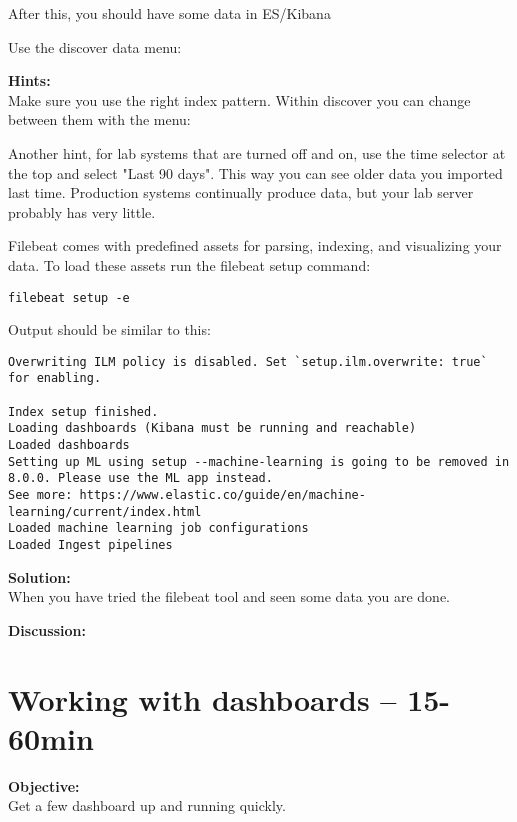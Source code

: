 \documentclass[a4paper,11pt,notitlepage]{report}
\begin{document}
After this, you should have some data in ES/Kibana

Use the discover data menu:


{\bf Hints:}\\
Make sure you use the right index pattern. Within discover you can change between them with the menu:


Another hint, for lab systems that are turned off and on, use the time selector at the top and select "Last 90 days". This way you can see older data you imported last time. Production systems continually produce data, but your lab server probably has very little.


Filebeat comes with predefined assets for parsing, indexing, and visualizing your data. To load these assets run the filebeat setup command:

\begin{verbatim}
filebeat setup -e
\end{verbatim}

Output should be similar to this:
\begin{verbatim}
Overwriting ILM policy is disabled. Set `setup.ilm.overwrite: true` for enabling.

Index setup finished.
Loading dashboards (Kibana must be running and reachable)
Loaded dashboards
Setting up ML using setup --machine-learning is going to be removed in 8.0.0. Please use the ML app instead.
See more: https://www.elastic.co/guide/en/machine-learning/current/index.html
Loaded machine learning job configurations
Loaded Ingest pipelines
\end{verbatim}


{\bf Solution:}\\
When you have tried the filebeat tool and seen some data you are done.

{\bf Discussion:}\\



\chapter{Working with dashboards -- 15-60min}
\label{ex:kibana-kts}

{\bf Objective:}\\
Get a few dashboard up and running quickly.
\end{document}
